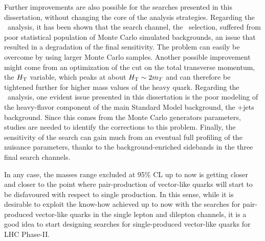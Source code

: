 Further improvements are also possible for the searches
presented in this dissertation, without changing the core of
the analysis strategies. Regarding the \wbx\ analysis, it
has been shown that the search channel, the \tight\ selection,
suffered from poor statistical population of Monte Carlo simulated
backgrounds, an issue that resulted in a degradation
of the final sensitivity. The problem can easily be overcome by
using larger Monte Carlo samples. Another possible improvement
might come from an optimization of the cut on the total transverse
momentum, the $\HT$ variable, which peaks at about $\HT\sim 2m_T$
and can therefore be tightened further for higher mass values of the
heavy quark. Regarding the \htx\ analysis, one evident issue
presented in this dissertation is the poor modeling of the
heavy-flavor component of the main Standard Model background, the
\ttbar+jets background.
Since this comes from the Monte Carlo generators parameters, 
studies are needed to identify the corrections to this problem.
Finally, the sensitivity of the search can gain much from an
eventual full profiling of the nuisance parameters, thanks to the
background-enriched sidebands in the three final search channels.

In any case, the masses range excluded at 95\% CL up to now
is getting closer and closer to the point where pair-production
of vector-like quarks will start to be disfavoured with respect
to single production. In this sense, while it is desirable to
exploit the know-how achieved up to now with the searches for
pair-produced vector-like quarks in the single lepton and dilepton
channels, it is a good idea to start designing searches for
single-produced vector-like quarks for LHC Phase-II.
